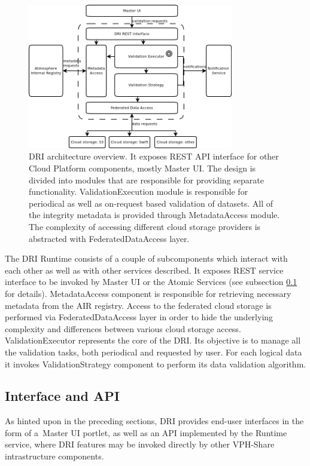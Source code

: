 \begin{figure}[h!]
	\centering
	\includegraphics[width=0.8\textwidth]{images/dri-architecture.png}
	\caption{DRI architecture overview. It exposes REST API interface for other
	Cloud Platform components, mostly Master UI. The design is divided into
	modules that are responsible for providing separate functionality.
	ValidationExecution module is responsible for periodical as well as on-request
	based validation of datasets. All of the integrity metadata is provided
	through MetadataAccess module. The complexity of accessing different cloud
	storage providers is abstracted with FederatedDataAccess layer.}
	\label{fig:dri-architecture}
\end{figure}

The DRI Runtime consists of a couple of subcomponents which interact with each
other as well as with other services described. It exposes REST service
interface to be invoked by Master UI or the Atomic Services (see subsection
\ref{dri-interface} for details). MetadataAccess component is responsible for
retrieving necessary metadata from the AIR registry. Access to the federated
cloud storage is performed via FederatedDataAccess layer in order to hide
the underlying complexity and differences between various cloud storage access.
ValidationExecutor represents the core of the DRI. Its objective is to manage
all the validation tasks, both periodical and requested by user. For
each logical data it invokes ValidationStrategy component to perform
its data validation algorithm.

\subsection{Interface and API}
\label{dri-interface}
As hinted upon in the preceding sections, DRI provides end-user interfaces
in the form of a~Master UI portlet, as well as an API implemented by the
Runtime service, where DRI features may be invoked directly by other VPH-Share
intrastructure components.\\

